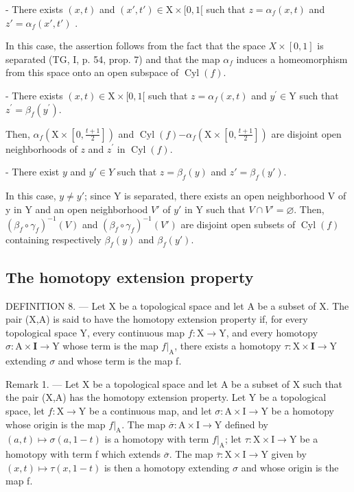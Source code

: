 - There exists \((x,t)\) and \((x',t') \in \mathrm{X} \times [0,1[\) such that \(z = \alpha_f(x,t)\) and \(z' = \alpha_f(x',t')\) .

In this case, the assertion follows from the fact that the space \(X \times [0,1]\) is separated (TG, I, p. 54, prop. 7) and that the map \(\alpha_{f}\) induces a homeomorphism from this space onto an open subspace of \(\operatorname{Cyl}(f)\).

- There exists \((x,t)\in \mathrm{X}\times [0,1[\) such that \(z = \alpha_{f}(x,t)\) and \(y^{\prime}\in \mathrm{Y}\) such that \(z^{\prime} = \beta_{f}(y^{\prime})\).

Then, \(\alpha_{f}(\mathrm{X}\times [0,\frac{t + 1}{2}])\) and \(\operatorname {Cyl}(f)\mathbf{-}\alpha_{f}(\mathrm{X}\times [0,\frac{t + 1}{2}])\) are disjoint open neighborhoods of \(z\) and \(z^{\prime}\) in \(\operatorname {Cyl}(f)\).

- There exist \(y\) and \(y'\in Y\) such that \(z=\beta_f(y)\) and \(z'=\beta_f(y')\).

In this case, \(y\neq y'\); since Y is separated, there exists an open neighborhood V of y in Y and an open neighborhood \(V'\) of \(y'\) in Y such that \(V\cap V'=\varnothing\). Then, \((\beta_f\circ\gamma_f)^{-1}(V)\) and \((\beta_f\circ\gamma_f)^{-1}(V')\) are disjoint open subsets of \(\operatorname{Cyl}(f)\) containing respectively \(\beta_f(y)\) and \(\beta_f(y')\).

\subsection{The homotopy extension property}

DEFINITION 8. --- Let X be a topological space and let A be a subset of X. The pair (X,A) is said to have the homotopy extension property if, for every topological space Y, every continuous map \(f:\mathrm{X}\to\mathrm{Y}\), and every homotopy \(\sigma:\mathrm{A}\times\mathbf{I}\to\mathrm{Y}\) whose term is the map \(f|_{\mathrm{A}}\), there exists a homotopy \(\tau:\mathrm{X}\times\mathbf{I}\to\mathrm{Y}\) extending \(\sigma\) and whose term is the map f.

Remark 1. --- Let X be a topological space and let A be a subset of X such that the pair (X,A) has the homotopy extension property. Let Y be a topological space, let \(f:\mathrm{X}\to\mathrm{Y}\) be a continuous map, and let \(\sigma:\mathrm{A}\times\mathrm{I}\to\mathrm{Y}\) be a homotopy whose origin is the map \(f|_{\mathrm{A}}\). The map \(\overline{\sigma}:\mathrm{A}\times\mathrm{I}\to\mathrm{Y}\) defined by \((a,t)\mapsto\sigma(a,1-t)\) is a homotopy with term \(f|_{\mathrm{A}}\); let \(\tau:\mathrm{X}\times\mathrm{I}\to\mathrm{Y}\) be a homotopy with term f which extends \(\overline{\sigma}\). The map \(\overline{\tau}:\mathrm{X}\times\mathrm{I}\to\mathrm{Y}\) given by \((x,t)\mapsto\tau(x,1-t)\) is then a homotopy extending \(\sigma\) and whose origin is the map f.

